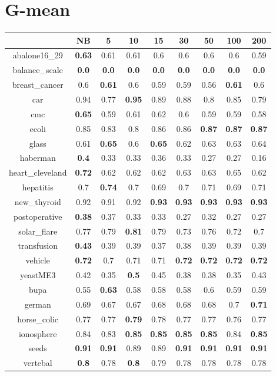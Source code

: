 \documentclass{article}%
\begin{document}
%
\section*{G{-}mean}%
\begin{tabular}{c|cccccccc}%
\hline%
&NB&5&10&15&30&50&100&200\\%
\hline%
abalone16\_29&\textbf{0.63}&0.61&0.61&0.6&0.6&0.6&0.6&0.59\\%
\hline%
balance\_scale&\textbf{0.0}&\textbf{0.0}&\textbf{0.0}&\textbf{0.0}&\textbf{0.0}&\textbf{0.0}&\textbf{0.0}&\textbf{0.0}\\%
\hline%
breast\_cancer&0.6&\textbf{0.61}&0.6&0.59&0.59&0.56&\textbf{0.61}&0.6\\%
\hline%
car&0.94&0.77&\textbf{0.95}&0.89&0.88&0.8&0.85&0.79\\%
\hline%
cmc&\textbf{0.65}&0.59&0.61&0.62&0.6&0.59&0.59&0.58\\%
\hline%
ecoli&0.85&0.83&0.8&0.86&0.86&\textbf{0.87}&\textbf{0.87}&\textbf{0.87}\\%
\hline%
glass&0.61&\textbf{0.65}&0.6&\textbf{0.65}&0.62&0.63&0.63&0.64\\%
\hline%
haberman&\textbf{0.4}&0.33&0.33&0.36&0.33&0.27&0.27&0.16\\%
\hline%
heart\_cleveland&\textbf{0.72}&0.62&0.62&0.62&0.63&0.63&0.65&0.62\\%
\hline%
hepatitis&0.7&\textbf{0.74}&0.7&0.69&0.7&0.71&0.69&0.71\\%
\hline%
new\_thyroid&0.92&0.91&0.92&\textbf{0.93}&\textbf{0.93}&\textbf{0.93}&\textbf{0.93}&\textbf{0.93}\\%
\hline%
postoperative&\textbf{0.38}&0.37&0.33&0.33&0.27&0.32&0.27&0.27\\%
\hline%
solar\_flare&0.77&0.79&\textbf{0.81}&0.79&0.73&0.76&0.72&0.7\\%
\hline%
transfusion&\textbf{0.43}&0.39&0.39&0.37&0.38&0.39&0.39&0.39\\%
\hline%
vehicle&\textbf{0.72}&0.7&0.71&0.71&\textbf{0.72}&\textbf{0.72}&\textbf{0.72}&\textbf{0.72}\\%
\hline%
yeastME3&0.42&0.35&\textbf{0.5}&0.45&0.38&0.38&0.35&0.43\\%
\hline%
bupa&0.55&\textbf{0.63}&0.58&0.58&0.58&0.6&0.59&0.59\\%
\hline%
german&0.69&0.67&0.67&0.68&0.68&0.68&0.7&\textbf{0.71}\\%
\hline%
horse\_colic&0.77&0.77&\textbf{0.79}&0.78&0.77&0.77&0.76&0.77\\%
\hline%
ionosphere&0.84&0.83&\textbf{0.85}&\textbf{0.85}&\textbf{0.85}&\textbf{0.85}&0.84&\textbf{0.85}\\%
\hline%
seeds&\textbf{0.91}&\textbf{0.91}&0.89&0.89&\textbf{0.91}&\textbf{0.91}&\textbf{0.91}&\textbf{0.91}\\%
\hline%
vertebal&\textbf{0.8}&0.78&\textbf{0.8}&0.79&0.78&0.78&0.78&0.78\\%
\hline%
\end{tabular}

%
\end{document}
